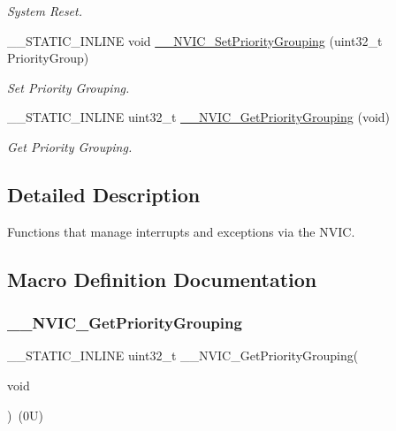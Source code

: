 \begin{DoxyCompactItemize}
\begin{DoxyCompactList}\small\item\em System Reset. \end{DoxyCompactList}\item 
\+\_\+\+\_\+\+S\+T\+A\+T\+I\+C\+\_\+\+I\+N\+L\+I\+NE void \hyperlink{group___c_m_s_i_s___core___n_v_i_c_functions_gafc94dcbaee03e4746ade1f5bb9aaa56d}{\+\_\+\+\_\+\+N\+V\+I\+C\+\_\+\+Set\+Priority\+Grouping} (uint32\+\_\+t Priority\+Group)
\begin{DoxyCompactList}\small\item\em Set Priority Grouping. \end{DoxyCompactList}\item 
\+\_\+\+\_\+\+S\+T\+A\+T\+I\+C\+\_\+\+I\+N\+L\+I\+NE uint32\+\_\+t \hyperlink{group___c_m_s_i_s___core___n_v_i_c_functions_ga9b894af672df4373eb637f8288845c05}{\+\_\+\+\_\+\+N\+V\+I\+C\+\_\+\+Get\+Priority\+Grouping} (void)
\begin{DoxyCompactList}\small\item\em Get Priority Grouping. \end{DoxyCompactList}\end{DoxyCompactItemize}


\subsection{Detailed Description}
Functions that manage interrupts and exceptions via the N\+V\+IC. 



\subsection{Macro Definition Documentation}
\mbox{\label{group___c_m_s_i_s___core___n_v_i_c_functions_gae1de06155d072758b3453edb07d12459}} 
\subsubsection{\texorpdfstring{\+\_\+\+\_\+\+N\+V\+I\+C\+\_\+\+Get\+Priority\+Grouping}{\_\_NVIC\_GetPriorityGrouping}}
{\footnotesize\ttfamily \+\_\+\+\_\+\+S\+T\+A\+T\+I\+C\+\_\+\+I\+N\+L\+I\+NE uint32\+\_\+t \+\_\+\+\_\+\+N\+V\+I\+C\+\_\+\+Get\+Priority\+Grouping(\begin{DoxyParamCaption}\item[{}]{void }\end{DoxyParamCaption})~(0\+U)}



